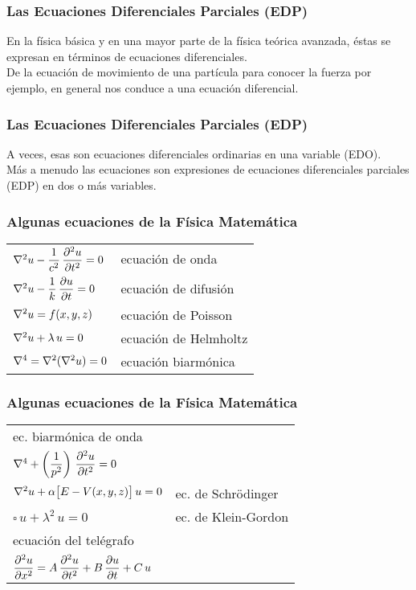 \documentclass[12pt]{beamer}
\begin{document}
\begin{frame}
\frametitle{Las Ecuaciones Diferenciales Parciales (EDP)}
En la física básica y en una mayor parte de la física teórica avanzada, éstas se expresan en términos de ecuaciones diferenciales.
\\
\bigskip
\pause
De la ecuación de movimiento de una partícula para conocer la fuerza por ejemplo, en general nos conduce a una ecuación diferencial.
\end{frame}
\begin{frame}
\frametitle{Las Ecuaciones Diferenciales Parciales (EDP)}
A veces, esas son ecuaciones diferenciales ordinarias en una variable (EDO).
\\
\bigskip
\pause
Más a menudo las ecuaciones son expresiones de ecuaciones diferenciales parciales (EDP) en dos o más variables.
\end{frame}
\begin{frame}
\frametitle{Algunas ecuaciones de la Física Matemática}
\begin{table}
\renewcommand{\arraystretch}{1.6}
\begin{tabular}{l@{\hskip 1cm} l@{\hskip 2cm}}
$\laplacian{u} - \dfrac{1}{c^{2}} \, \displaystyle \pdv[2]{u}{t} = 0$ &ecuación de onda \pause \\
$\laplacian{u} - \dfrac{1}{k} \, \displaystyle \pdv{u}{t} = 0$ & ecuación de difusión \pause \\
$\laplacian{u} = f(x, y, z)$ & ecuación de Poisson \pause \\
$\laplacian{u} + \lambda \, u = 0$ & ecuación de Helmholtz \pause \\
$\nabla^{4} = \laplacian{(\laplacian{u})} = 0$ & ecuación biarmónica
\end{tabular}
\end{table}
\end{frame}
\begin{frame}
\frametitle{Algunas ecuaciones de la Física Matemática}
\begin{table}
\renewcommand{\arraystretch}{1.5}
\begin{tabular}{l l@{\hskip 0.6cm}}
ec. biarmónica de onda & \\
$\nabla^{4} + \left( \dfrac{1}{p^{2}} \right) \, \displaystyle \pdv[2]{u}{t} = 0$ &  \pause \\
$\laplacian{u} + \alpha \big[ E - V(x, y, z) \big] \, u = 0$ & ec. de Schrödinger \pause \\
$\square \, u + \lambda^{2} \, u = 0$ & ec. de Klein-Gordon \pause \\
ecuación del telégrafo & \\
$\displaystyle \pdv[2]{u}{x} = A \, \displaystyle \pdv[2]{u}{t} + B \, \displaystyle \pdv{u}{t} + C \, u$ & \\
\end{tabular}
\end{table}
\end{frame}
\end{document}
